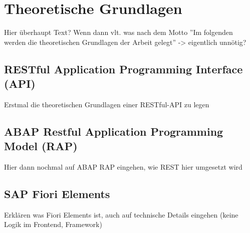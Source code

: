 \chapter{Theoretische Grundlagen}

Hier überhaupt Text? Wenn dann vlt. was nach dem Motto ''Im folgenden werden die theoretischen Grundlagen der Arbeit gelegt'' -> eigentlich unnötig?

\section{RESTful Application Programming Interface (API)}

Erstmal die theoretischen Grundlagen einer RESTful-API zu legen

\section{ABAP Restful Application Programming Model (RAP)}

Hier dann nochmal auf ABAP RAP eingehen, wie REST hier umgesetzt wird

\section{SAP Fiori Elements}

Erklären was Fiori Elements ist, auch auf technische Details eingehen (keine Logik im Frontend, Framework)


